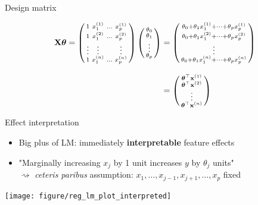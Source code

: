 \documentclass[11pt,compress,t,notes=noshow, xcolor=table]{beamer}
\begin{document}
\begin{vbframe}{Design matrix}
\begin{itemize}
\begin{align*}
\mathbf{X} \bm{\theta} = 
    \left(
    \begin{smallmatrix}
        1 & x^{(1)}_1 & \ldots & x^{(1)}_p \\
        1 & x^{(2)}_1 & \ldots & x^{(2)}_p \\
        \vdots & \vdots & & \vdots \\
        1 & x^{(n)}_1 & \ldots & x^{(n)}_p \\
    \end{smallmatrix}
    \right)
    \left(
    \begin{smallmatrix}
        \theta_0 \\ \theta_1 \\ \vdots \\ \theta_p
    \end{smallmatrix}
    \right)
    &=
    \left(
    \begin{smallmatrix}
        \theta_0 + \theta_1 x_1^{(1)} + \dots + \theta_p x_p^{(1)} \\
        \theta_0 + \theta_1 x_1^{(2)} + \dots + \theta_p x_p^{(2)} \\
        \vdots \\
        \theta_0 + \theta_1 x_1^{(n)} + \dots + \theta_p x_p^{(n)} \\
    \end{smallmatrix}
    \right) \\[2ex]
    &=
    \left(
    \begin{smallmatrix}
        \bm{\theta}^\top \mathbf{x}^{(1)} \\
        \bm{\theta}^\top \mathbf{x}^{(2)} \\
        \vdots \\
        \bm{\theta}^\top \mathbf{x}^{(n)} \\
    \end{smallmatrix}
    \right)
\end{align*}

\end{itemize}

\end{vbframe}


\begin{vbframe}{Effect interpretation}

\begin{itemize}
    \item Big plus of LM: immediately \textbf{interpretable} feature effects
    \item "Marginally increasing $x_j$ by 1 unit increases $y$ by $\theta_j$ 
    units" \\
    $\rightsquigarrow$ \textit{ceteris paribus} assumption: 
    $x_1, \dots, x_{j - 1}, x_{j + 1}, \dots, x_p$ fixed
\end{itemize}

\texttt{[image: figure/reg\_lm\_plot\_interpreted]} 

\end{vbframe}
\end{document}
